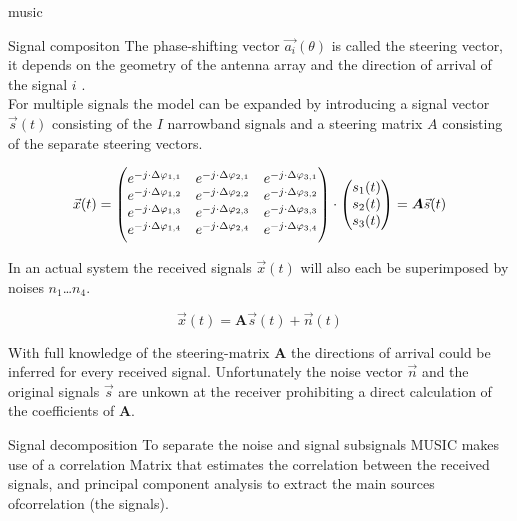 \begin{subchapter}{\acrshort{music}}
\begin{subsubchapter}{Signal compositon}
    The phase-shifting vector $\vec{a_{i}}(\theta)$ is called the
    steering vector, it depends on the geometry of the antenna array
    and the direction of arrival of the signal $i$ \cite{chengokeda2010}. \\

    For multiple signals the model can be expanded by
    introducing a signal vector $\vec{s}(t)$ consisting
    of the $I$ narrowband signals and a steering matrix
    $A$ consisting of the separate steering vectors.

    \begin{equation}
      \vec{x}(t) =
        \begin{pmatrix}
          e^{-j \cdot \Delta\varphi_{1,1}} & e^{-j \cdot \Delta\varphi_{2,1}} & e^{-j \cdot \Delta\varphi_{3,1}} \\
          e^{-j \cdot \Delta\varphi_{1,2}} & e^{-j \cdot \Delta\varphi_{2,2}} & e^{-j \cdot \Delta\varphi_{3,2}} \\
          e^{-j \cdot \Delta\varphi_{1,3}} & e^{-j \cdot \Delta\varphi_{2,3}} & e^{-j \cdot \Delta\varphi_{3,3}} \\
          e^{-j \cdot \Delta\varphi_{1,4}} & e^{-j \cdot \Delta\varphi_{2,4}} & e^{-j \cdot \Delta\varphi_{3,4}}
        \end{pmatrix}
        \cdot
        \begin{pmatrix}
          s_{1}(t) \\
          s_{2}(t) \\
          s_{3}(t)
        \end{pmatrix}
      = \\
      \bm{A} \vec{s}(t)
    \end{equation}

    In an actual system the received signals $\vec{x}(t)$ will also
    each be superimposed by noises $n_{1}$…$n_{4}$.

    \begin{equation}
      \vec{x}(t) =  \bm{A} \vec{s}(t) + \vec{n}(t)
    \end{equation}

    With full knowledge of the steering-matrix $\bm{A}$ the
    directions of arrival could be inferred for every received
    signal. Unfortunately the noise vector $\vec{n}$ and the
    original signals $\vec{s}$ are unkown at the receiver prohibiting
    a direct calculation of the coefficients of $\bm{A}$.
  \end{subsubchapter}

  \begin{subsubchapter}{Signal decomposition}
    To separate the noise and signal subsignals
    MUSIC makes use of a correlation Matrix
    that estimates the correlation between the received
    signals, and principal component analysis to
    extract the main sources ofcorrelation
    \cite{vibergottersten1991} (the signals). \\


\end{subsubchapter}
\end{subchapter}
